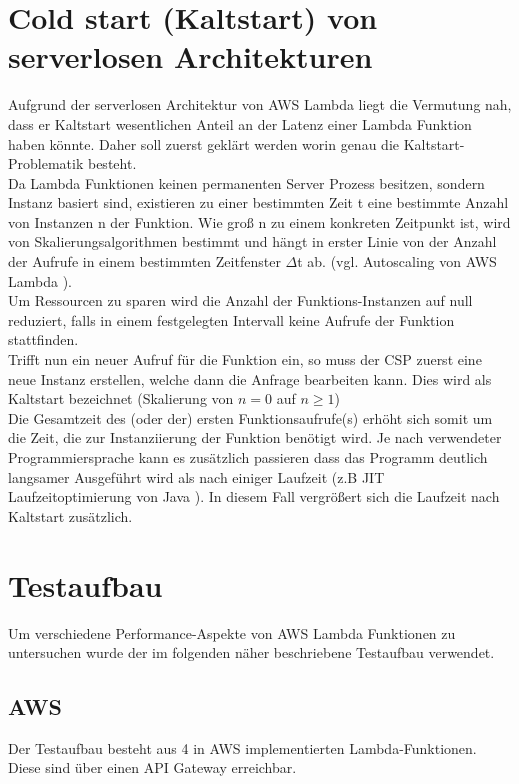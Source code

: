 \documentclass[12pt,a4paper,parskip=half]{scrreprt}
\begin{document}
\section{Cold start (Kaltstart) von serverlosen Architekturen}
Aufgrund der serverlosen Architektur von AWS Lambda liegt die Vermutung nah, dass er Kaltstart wesentlichen Anteil an der Latenz einer Lambda Funktion haben könnte. Daher soll zuerst geklärt werden worin genau die Kaltstart-Problematik besteht.
\\
Da Lambda Funktionen keinen permanenten Server Prozess besitzen, sondern Instanz basiert sind, existieren zu einer bestimmten Zeit t eine bestimmte Anzahl von Instanzen n der Funktion. Wie groß n zu einem konkreten Zeitpunkt ist, wird von Skalierungsalgorithmen bestimmt und hängt in erster Linie von der Anzahl der Aufrufe in einem bestimmten Zeitfenster $\Delta$t ab. (vgl. Autoscaling von AWS Lambda \cite{Lambda-overview}).
\\
Um Ressourcen zu sparen wird die Anzahl der Funktions-Instanzen auf null reduziert, falls in einem festgelegten Intervall keine Aufrufe der Funktion stattfinden.
\\
Trifft nun ein neuer Aufruf für die Funktion ein, so muss der CSP zuerst eine neue Instanz erstellen, welche dann die Anfrage bearbeiten kann. Dies wird als Kaltstart bezeichnet (Skalierung von $n=0$ auf $n\geq1$)
\\
Die Gesamtzeit des (oder der) ersten Funktionsaufrufe(s) erhöht sich somit um die Zeit, die zur Instanziierung der Funktion benötigt wird. Je nach verwendeter Programmiersprache kann es zusätzlich passieren dass das Programm deutlich langsamer Ausgeführt wird als nach einiger Laufzeit (z.B JIT Laufzeitoptimierung von Java \cite{Java-JIT}). In diesem Fall vergrößert sich die Laufzeit nach Kaltstart zusätzlich.

\section{Testaufbau}
Um verschiedene Performance-Aspekte von AWS Lambda Funktionen zu untersuchen wurde der im folgenden näher beschriebene Testaufbau verwendet.

\subsection{AWS}

Der Testaufbau besteht aus 4 in AWS implementierten Lambda-Funktionen. Diese sind über einen API Gateway erreichbar.
\end{document}
